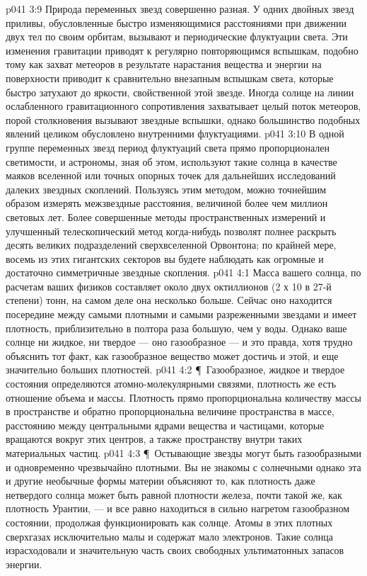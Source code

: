 \vs p041 3:9 Природа переменных звезд совершенно разная. У одних двойных звезд приливы, обусловленные быстро изменяющимися расстояниями при движении двух тел по своим орбитам, вызывают и периодические флуктуации света. Эти изменения гравитации приводят к регулярно повторяющимся вспышкам, подобно тому как захват метеоров в результате нарастания вещества и энергии на поверхности приводит к сравнительно внезапным вспышкам света, которые быстро затухают до яркости, свойственной этой звезде. Иногда солнце на линии ослабленного гравитационного сопротивления захватывает целый поток метеоров, порой столкновения вызывают звездные вспышки, однако большинство подобных явлений целиком обусловлено внутренними флуктуациями.
\vs p041 3:10 В одной группе переменных звезд период флуктуаций света прямо пропорционален светимости, и астрономы, зная об этом, используют такие солнца в качестве маяков вселенной или точных опорных точек для дальнейших исследований далеких звездных скоплений. Пользуясь этим методом, можно точнейшим образом измерять межзвездные расстояния, величиной более чем миллион световых лет. Более совершенные методы пространственных измерений и улучшенный телескопический метод когда\hyp{}нибудь позволят полнее раскрыть десять великих подразделений сверхвселенной Орвонтона; по крайней мере, восемь из этих гигантских секторов вы будете наблюдать как огромные и достаточно симметричные звездные скопления.
\vs p041 4:1 Масса вашего солнца, по расчетам ваших физиков составляет около двух октиллионов (2 х 10 в 27\hyp{}й степени) тонн, на самом деле она несколько больше. Сейчас оно находится посередине между самыми плотными и самыми разреженными звездами и имеет плотность, приблизительно в полтора раза большую, чем у воды. Однако ваше солнце ни жидкое, ни твердое --- оно газообразное --- и это правда, хотя трудно объяснить тот факт, как газообразное вещество может достичь и этой, и еще значительно больших плотностей.
\vs p041 4:2 \P\ Газообразное, жидкое и твердое состояния определяются атомно\hyp{}молекулярными связями, плотность же есть отношение объема и массы. Плотность прямо пропорциональна количеству массы в пространстве и обратно пропорциональна величине пространства в массе, расстоянию между центральными ядрами вещества и частицами, которые вращаются вокруг этих центров, а также пространству внутри таких материальных частиц.
\vs p041 4:3 \P\ Остывающие звезды могут быть газообразными и одновременно чрезвычайно плотными. Вы не знакомы с солнечными  однако эта и другие необычные формы материи объясняют то, как плотность даже нетвердого солнца может быть равной плотности железа, почти такой же, как плотность Урантии, --- и все равно находиться в сильно нагретом газообразном состоянии, продолжая функционировать как солнце. Атомы в этих плотных сверхгазах исключительно малы и содержат мало электронов. Такие солнца израсходовали и значительную часть своих свободных ультиматонных запасов энергии.
